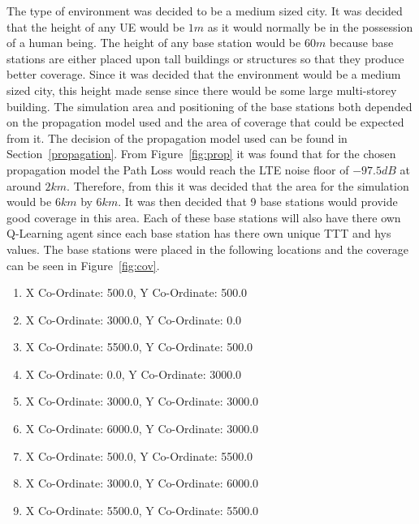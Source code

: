 The type of environment was decided to be a medium sized city. It was decided that the height of any UE would be $1 m$ as it would normally be in the possession of a human being. The height of any base station would be $60 m$ because base stations are either placed upon tall buildings or structures so that they produce better coverage. Since it was decided that the environment would be a medium sized city, this height made sense since there would be some large multi-storey building. The simulation area and positioning of the base stations both depended on the propagation model used and the area of coverage that could be expected from it. The decision of the propagation model used can be found in Section~\ref{propagation}. From Figure~\ref{fig:prop} it was found that for the chosen propagation model the Path Loss would reach the LTE noise floor of $-97.5 dB$ at around $2 km$. Therefore, from this it was decided that the area for the simulation would be $6 km$ by $6 km$. It was then decided that 9 base stations would provide good coverage in this area. Each of these base stations will also have there own Q-Learning agent since each base station has there own unique TTT and hys values. The base stations were placed in the following locations and the coverage can be seen in Figure~\ref{fig:cov}.
\begin{enumerate}
\item X Co-Ordinate: 500.0, Y Co-Ordinate: 500.0
\item X Co-Ordinate: 3000.0, Y Co-Ordinate: 0.0
\item X Co-Ordinate: 5500.0, Y Co-Ordinate: 500.0
\item X Co-Ordinate: 0.0, Y Co-Ordinate: 3000.0
\item X Co-Ordinate: 3000.0, Y Co-Ordinate: 3000.0
\item X Co-Ordinate: 6000.0, Y Co-Ordinate: 3000.0
\item X Co-Ordinate: 500.0, Y Co-Ordinate: 5500.0
\item X Co-Ordinate: 3000.0, Y Co-Ordinate: 6000.0
\item X Co-Ordinate: 5500.0, Y Co-Ordinate: 5500.0
\end{enumerate}
